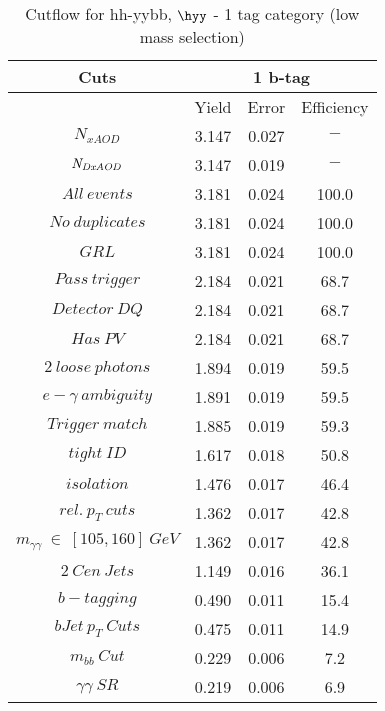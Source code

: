 \begin{table}\footnotesize
\begin{center} 
\caption{Cutflow for hh-yybb, $\hyy$ - 1 tag category (low mass selection)}
\begin{tabular}{|c|c|c|c|} 
 \hline 
Cuts& \multicolumn{3}{c|}{1 b-tag} \\ \hline 
 &Yield&Error&Efficiency\\ \hline 
$N_{xAOD}$ & 3.147&0.027 &$-$ \\ 
 \hline 
$\it{N}_{DxAOD}$ & 3.147&0.019 &$-$ \\ 
 \hline 
$All\ events$ & 3.181&0.024 &100.0 \\ 
 \hline 
$No\ duplicates$ & 3.181&0.024 &100.0 \\ 
 \hline 
$GRL$ & 3.181&0.024 &100.0 \\ 
 \hline 
$Pass\ trigger$ & 2.184&0.021 &68.7 \\ 
 \hline 
$Detector\ DQ$ & 2.184&0.021 &68.7 \\ 
 \hline 
$Has\ PV$ & 2.184&0.021 &68.7 \\ 
 \hline 
$2\ loose\ photons$ & 1.894&0.019 &59.5 \\ 
 \hline 
$e-\gamma\ ambiguity$ & 1.891&0.019 &59.5 \\ 
 \hline 
$Trigger\ match$ & 1.885&0.019 &59.3 \\ 
 \hline 
$tight\ ID$ & 1.617&0.018 &50.8 \\ 
 \hline 
$isolation$ & 1.476&0.017 &46.4 \\ 
 \hline 
$rel.\ p_{T}\ cuts$ & 1.362&0.017 &42.8 \\ 
 \hline 
$m_{\gamma\gamma}\ \in\ [105,160]\ GeV$ & 1.362&0.017 &42.8 \\ 
 \hline 
$2\ Cen\ Jets$ & 1.149&0.016 &36.1 \\ 
 \hline 
$b-tagging$ & 0.490&0.011 &15.4 \\ 
 \hline 
$bJet\ p_{T}\ Cuts$ & 0.475&0.011 &14.9 \\ 
 \hline 
$m_{bb}\ Cut$ & 0.229&0.006 & 7.2 \\ 
 \hline 
$\gamma\gamma\ SR$ & 0.219&0.006 & 6.9 \\ 
 \hline 
\end{tabular}
\end{center}
\end{table}
